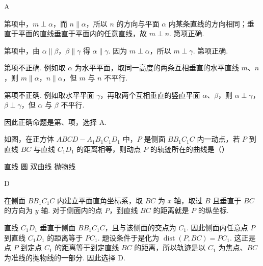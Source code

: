 \begin{answer}
A
\end{answer}

\begin{solution}
第项中，\(m\perp\alpha\)，而 \(n\parallel\alpha\)，所以 \(n\) 的方向与平面 \(\alpha\) 内某条直线的方向相同；垂直于平面的直线垂直于平面内的任意直线，故 \(m\perp n\). 第项正确.

第项中，由 \(\alpha\parallel\beta\)，\(\beta\parallel\gamma\) 得 \(\alpha\parallel\gamma\). 因为 \(m\perp\alpha\)，所以 \(m\perp\gamma\). 第项正确.

第项不正确. 例如取 \(\alpha\) 为水平平面，取同一高度的两条互相垂直的水平直线 \(m\)、\(n\)，则 \(m\parallel\alpha\)，\(n\parallel\alpha\)，但 \(m\) 与 \(n\) 不平行.

第项不正确. 例如取水平平面 \(\gamma\)，再取两个互相垂直的竖直平面 \(\alpha\)、\(\beta\)，则 \(\alpha\perp\gamma\)，\(\beta\perp\gamma\)，但 \(\alpha\) 与 \(\beta\) 不平行.

因此正确命题是第、项，选择 A.
\end{solution}

\begin{problem}
如图，在正方体 \(ABCD-A_1B_1C_1D_1\) 中，\(P\) 是侧面 \(BB_1C_1C\) 内一动点，若 \(P\) 到直线 \(BC\) 与直线 \(C_1D_1\) 的距离相等，则动点 \(P\) 的轨迹所在的曲线是（\quad）


\choices
    {直线}
    {圆}
    {双曲线}
    {抛物线}
\end{problem}

\begin{answer}
D
\end{answer}

\begin{solution}
在侧面 \(BB_1C_1C\) 内建立平面直角坐标系，取 \(BC\) 为 \(x\) 轴，取过 \(B\) 且垂直于 \(BC\) 的方向为 \(y\) 轴. 对于侧面内的点 \(P\)，到直线 \(BC\) 的距离就是 \(P\) 的纵坐标.

直线 \(C_1D_1\) 垂直于侧面 \(BB_1C_1C\)，且与该侧面的交点为 \(C_1\). 因此侧面内任意点 \(P\) 到直线 \(C_1D_1\) 的距离等于 \(PC_1\). 题设条件于是化为
\(\operatorname{dist}(P,BC)=PC_1\).
这正是点 \(P\) 到定点 \(C_1\) 的距离等于到定直线 \(BC\) 的距离，所以轨迹是以 \(C_1\) 为焦点、\(BC\) 为准线的抛物线的一部分. 因此选择 D.
\end{solution}

